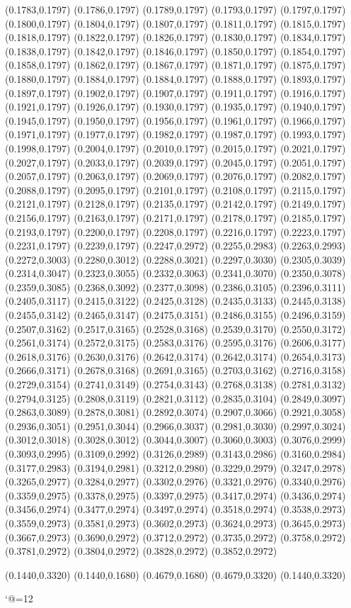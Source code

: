 (0.1783,0.1797)
(0.1786,0.1797)
(0.1789,0.1797)
(0.1793,0.1797)
(0.1797,0.1797)
(0.1800,0.1797)
(0.1804,0.1797)
(0.1807,0.1797)
(0.1811,0.1797)
(0.1815,0.1797)
(0.1818,0.1797)
(0.1822,0.1797)
(0.1826,0.1797)
(0.1830,0.1797)
(0.1834,0.1797)
(0.1838,0.1797)
(0.1842,0.1797)
(0.1846,0.1797)
(0.1850,0.1797)
(0.1854,0.1797)
(0.1858,0.1797)
(0.1862,0.1797)
(0.1867,0.1797)
(0.1871,0.1797)
(0.1875,0.1797)
(0.1880,0.1797)
(0.1884,0.1797)
\PST@Solid(0.1884,0.1797)
(0.1888,0.1797)
(0.1893,0.1797)
(0.1897,0.1797)
(0.1902,0.1797)
(0.1907,0.1797)
(0.1911,0.1797)
(0.1916,0.1797)
(0.1921,0.1797)
(0.1926,0.1797)
(0.1930,0.1797)
(0.1935,0.1797)
(0.1940,0.1797)
(0.1945,0.1797)
(0.1950,0.1797)
(0.1956,0.1797)
(0.1961,0.1797)
(0.1966,0.1797)
(0.1971,0.1797)
(0.1977,0.1797)
(0.1982,0.1797)
(0.1987,0.1797)
(0.1993,0.1797)
(0.1998,0.1797)
(0.2004,0.1797)
(0.2010,0.1797)
(0.2015,0.1797)
(0.2021,0.1797)
(0.2027,0.1797)
(0.2033,0.1797)
(0.2039,0.1797)
(0.2045,0.1797)
(0.2051,0.1797)
(0.2057,0.1797)
(0.2063,0.1797)
(0.2069,0.1797)
(0.2076,0.1797)
(0.2082,0.1797)
(0.2088,0.1797)
(0.2095,0.1797)
(0.2101,0.1797)
(0.2108,0.1797)
(0.2115,0.1797)
(0.2121,0.1797)
(0.2128,0.1797)
(0.2135,0.1797)
(0.2142,0.1797)
(0.2149,0.1797)
(0.2156,0.1797)
(0.2163,0.1797)
(0.2171,0.1797)
(0.2178,0.1797)
(0.2185,0.1797)
(0.2193,0.1797)
(0.2200,0.1797)
(0.2208,0.1797)
(0.2216,0.1797)
(0.2223,0.1797)
(0.2231,0.1797)
(0.2239,0.1797)
(0.2247,0.2972)
(0.2255,0.2983)
(0.2263,0.2993)
(0.2272,0.3003)
(0.2280,0.3012)
(0.2288,0.3021)
(0.2297,0.3030)
(0.2305,0.3039)
(0.2314,0.3047)
(0.2323,0.3055)
(0.2332,0.3063)
(0.2341,0.3070)
(0.2350,0.3078)
(0.2359,0.3085)
(0.2368,0.3092)
(0.2377,0.3098)
(0.2386,0.3105)
(0.2396,0.3111)
(0.2405,0.3117)
(0.2415,0.3122)
(0.2425,0.3128)
(0.2435,0.3133)
(0.2445,0.3138)
(0.2455,0.3142)
(0.2465,0.3147)
(0.2475,0.3151)
(0.2486,0.3155)
(0.2496,0.3159)
(0.2507,0.3162)
(0.2517,0.3165)
(0.2528,0.3168)
(0.2539,0.3170)
(0.2550,0.3172)
(0.2561,0.3174)
(0.2572,0.3175)
(0.2583,0.3176)
(0.2595,0.3176)
(0.2606,0.3177)
(0.2618,0.3176)
(0.2630,0.3176)
(0.2642,0.3174)
\PST@Solid(0.2642,0.3174)
(0.2654,0.3173)
(0.2666,0.3171)
(0.2678,0.3168)
(0.2691,0.3165)
(0.2703,0.3162)
(0.2716,0.3158)
(0.2729,0.3154)
(0.2741,0.3149)
(0.2754,0.3143)
(0.2768,0.3138)
(0.2781,0.3132)
(0.2794,0.3125)
(0.2808,0.3119)
(0.2821,0.3112)
(0.2835,0.3104)
(0.2849,0.3097)
(0.2863,0.3089)
(0.2878,0.3081)
(0.2892,0.3074)
(0.2907,0.3066)
(0.2921,0.3058)
(0.2936,0.3051)
(0.2951,0.3044)
(0.2966,0.3037)
(0.2981,0.3030)
(0.2997,0.3024)
(0.3012,0.3018)
(0.3028,0.3012)
(0.3044,0.3007)
(0.3060,0.3003)
(0.3076,0.2999)
(0.3093,0.2995)
(0.3109,0.2992)
(0.3126,0.2989)
(0.3143,0.2986)
(0.3160,0.2984)
(0.3177,0.2983)
(0.3194,0.2981)
(0.3212,0.2980)
(0.3229,0.2979)
(0.3247,0.2978)
(0.3265,0.2977)
(0.3284,0.2977)
(0.3302,0.2976)
(0.3321,0.2976)
(0.3340,0.2976)
(0.3359,0.2975)
(0.3378,0.2975)
(0.3397,0.2975)
(0.3417,0.2974)
(0.3436,0.2974)
(0.3456,0.2974)
(0.3477,0.2974)
(0.3497,0.2974)
(0.3518,0.2974)
(0.3538,0.2973)
(0.3559,0.2973)
(0.3581,0.2973)
(0.3602,0.2973)
(0.3624,0.2973)
(0.3645,0.2973)
(0.3667,0.2973)
(0.3690,0.2972)
(0.3712,0.2972)
(0.3735,0.2972)
(0.3758,0.2972)
(0.3781,0.2972)
(0.3804,0.2972)
(0.3828,0.2972)
(0.3852,0.2972)

\PST@Border(0.1440,0.3320)
(0.1440,0.1680)
(0.4679,0.1680)
(0.4679,0.3320)
(0.1440,0.3320)

\catcode`@=12
\fi
\endpspicture
